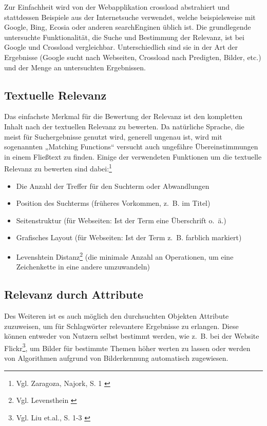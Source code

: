 Zur Einfachheit wird von der Webapplikation \gls{crossload} abstrahiert und stattdessen Beispiele aus der Internetsuche verwendet, welche beispielsweise mit Google, Bing, Ecosia oder anderen \gls{searchEngine}n üblich ist.
Die grundlegende untersuchte Funktionalität, die Suche und Bestimmung der Relevanz, ist bei Google und Crossload vergleichbar. Unterschiedlich sind sie in der Art der Ergebnisse (Google sucht nach Webseiten, Crossload nach Predigten, Bilder, etc.) und der Menge an untersuchten Ergebnissen.

\subsection{Textuelle Relevanz}
\label{sub:relevanceText}
Das einfachste Merkmal für die Bewertung der Relevanz ist den kompletten Inhalt nach der textuellen Relevanz zu bewerten.
Da natürliche Sprache, die meist für Suchergebnisse genutzt wird, generell ungenau ist, wird mit sogenannten „Matching Functions“ versucht auch ungefähre Übereinstimmungen in einem Fließtext zu finden.
Einige der verwendeten Funktionen um die textuelle Relevanz zu bewerten sind dabei:\footnote{Vgl. Zaragoza, Najork, S. 1 \cite{zaragoza2018}}

\begin{itemize}
  \item Die Anzahl der Treffer für den Suchterm oder Abwandlungen
  \item Position des Suchterms (früheres Vorkommen, z. B. im Titel)
  \item Seitenstruktur (für Webseiten: Ist der Term eine Überschrift o. ä.)
  \item Grafisches Layout (für Webseiten: Ist der Term z. B. farblich markiert)
  \item Levenshtein Distanz\footnote{Vgl. Levensthein \cite{levenshtein1966binary}} (die minimale Anzahl an Operationen, um eine Zeichenkette in eine andere umzuwandeln)
\end{itemize}

\subsection{Relevanz durch Attribute}
\label{sub:relevanceAttribute}
Des Weiteren ist es auch möglich den durchsuchten Objekten Attribute zuzuweisen, um für Schlagwörter relevantere Ergebnisse zu erlangen.
Diese können entweder von Nutzern selbst bestimmt werden, wie z. B. bei der Website Flickr\footnote{Vgl. Liu et.al., S. 1-3 \cite{liu2009}}, um Bilder für bestimmte Themen höher werten zu lassen oder werden von Algorithmen aufgrund von Bilderkennung automatisch zugewiesen.

